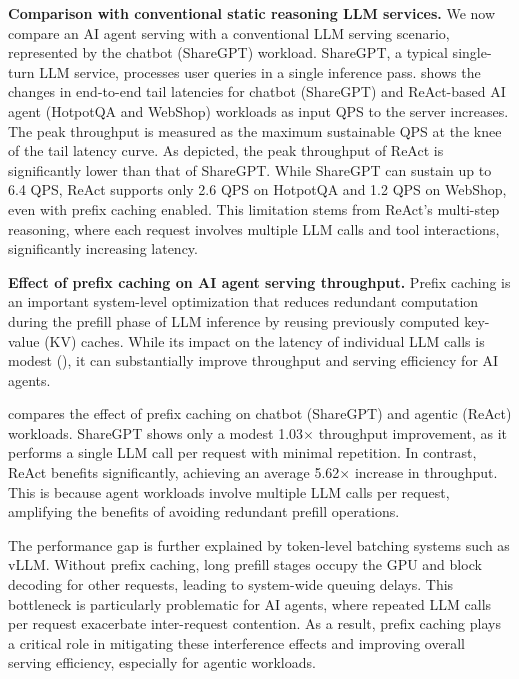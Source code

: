 \textbf{Comparison with conventional static reasoning LLM services.}
We now compare an AI agent serving with a conventional LLM serving scenario, represented by the chatbot (ShareGPT) workload. ShareGPT, a typical single-turn LLM service, processes user queries in a single inference pass.  shows the changes in end-to-end tail latencies for chatbot (ShareGPT) and ReAct-based AI agent (HotpotQA and WebShop) workloads as input QPS to the server increases. The peak throughput is measured as the maximum sustainable QPS at the knee of the tail latency curve. As depicted, the peak throughput of ReAct is significantly lower than that of ShareGPT. While ShareGPT can sustain up to 6.4 QPS, ReAct supports only 2.6 QPS on HotpotQA and 1.2 QPS on WebShop, even with prefix caching enabled. This limitation stems from ReAct’s multi-step reasoning, where each request involves multiple LLM calls and tool interactions, significantly increasing latency. 



\textbf{Effect of prefix caching on AI agent serving throughput.}
Prefix caching is an important system-level optimization that reduces redundant computation during the prefill phase of LLM inference by reusing previously computed key-value (KV) caches. While its impact on the latency of individual LLM calls is modest (), it can substantially improve throughput and serving efficiency for AI agents.


 compares the effect of prefix caching on chatbot (ShareGPT) and agentic (ReAct) workloads. ShareGPT shows only a modest 1.03$\times$ throughput improvement, as it performs a single LLM call per request with minimal repetition. In contrast, ReAct benefits significantly, achieving an average 5.62$\times$ increase in throughput. This is because agent workloads involve multiple LLM calls per request, amplifying the benefits of avoiding redundant prefill operations.


The performance gap is further explained by token-level batching systems such as vLLM. Without prefix caching, long prefill stages occupy the GPU and block decoding for other requests, leading to system-wide queuing delays. This bottleneck is particularly problematic for AI agents, where repeated LLM calls per request exacerbate inter-request contention. As a result, prefix caching plays a critical role in mitigating these interference effects and improving overall serving efficiency, especially for agentic workloads.

